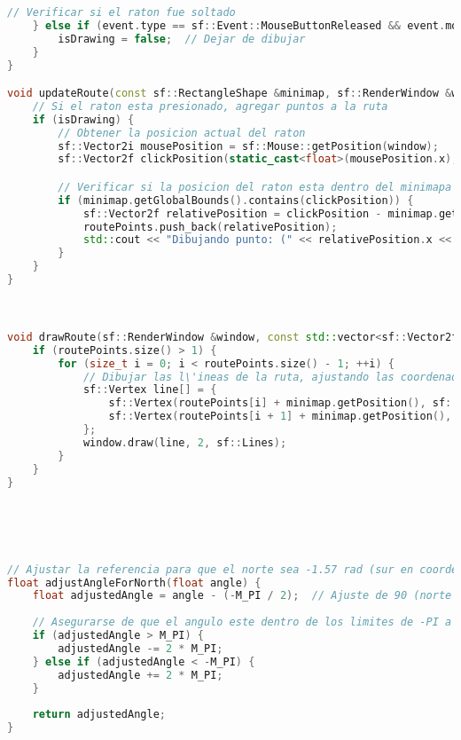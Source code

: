 \begin{lstlisting}[language={C++}, caption={Cuarto ajuste de c\'odigo}, label={CuartoAjuste}]
    // Verificar si el raton fue soltado
    } else if (event.type == sf::Event::MouseButtonReleased && event.mouseButton.button == sf::Mouse::Left) {
        isDrawing = false;  // Dejar de dibujar
    }
}

void updateRoute(const sf::RectangleShape &minimap, sf::RenderWindow &window) {
    // Si el raton esta presionado, agregar puntos a la ruta
    if (isDrawing) {
        // Obtener la posicion actual del raton
        sf::Vector2i mousePosition = sf::Mouse::getPosition(window);
        sf::Vector2f clickPosition(static_cast<float>(mousePosition.x), static_cast<float>(mousePosition.y));

        // Verificar si la posicion del raton esta dentro del minimapa
        if (minimap.getGlobalBounds().contains(clickPosition)) {
            sf::Vector2f relativePosition = clickPosition - minimap.getPosition();
            routePoints.push_back(relativePosition);
            std::cout << "Dibujando punto: (" << relativePosition.x << ", " << relativePosition.y << ")" << std::endl;
        }
    }
}



void drawRoute(sf::RenderWindow &window, const std::vector<sf::Vector2f> &routePoints, const sf::RectangleShape &minimap) {
    if (routePoints.size() > 1) {
        for (size_t i = 0; i < routePoints.size() - 1; ++i) {
            // Dibujar las l\'ineas de la ruta, ajustando las coordenadas en funci\'on de la posici\'on del robot
            sf::Vertex line[] = {
                sf::Vertex(routePoints[i] + minimap.getPosition(), sf::Color::Red), // Ajuste de posici\'on para el minimapa
                sf::Vertex(routePoints[i + 1] + minimap.getPosition(), sf::Color::Red)
            };
            window.draw(line, 2, sf::Lines);
        }
    }
}





// Ajustar la referencia para que el norte sea -1.57 rad (sur en coordenadas cartesianas es 0 rad)
float adjustAngleForNorth(float angle) {
    float adjustedAngle = angle - (-M_PI / 2);  // Ajuste de 90 (norte en -90)
    
    // Asegurarse de que el angulo este dentro de los limites de -PI a PI
    if (adjustedAngle > M_PI) {
        adjustedAngle -= 2 * M_PI;
    } else if (adjustedAngle < -M_PI) {
        adjustedAngle += 2 * M_PI;
    }
    
    return adjustedAngle;
}








\end{lstlisting}
